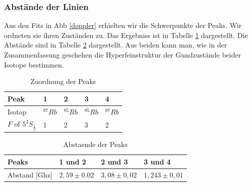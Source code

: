 \documentclass[12pt]{article}
\begin{document}
\subsubsection{Abstände der Linien}
Aus den Fits in Abb \ref{doppler} erhielten wir die Schwerpunkte der Peaks. Wir ordneten sie ihren Zuständen zu. Das Ergebniss ist in Tabelle \ref{order} dargestellt. Die Abstände sind in Tabelle \ref{dist} dargestellt. Aus beiden kann man, wie in der Zusammenfassung geschehen die Hyperfeinstruktur der Gundzustände beider Isotope bestimmen.

\begin{table}[H]
\begin{center}
\begin{tabular}{|l|l|l|l|l|}
\hline 
Peak & 1 & 2 & 3 & 4\\
\hline
Isotop & $^{87}Rb$ & $^{85}Rb$ & $^{85}Rb$ & $^{87}Rb$\\
$F$ of $5^2S_{\frac{1}{2}}$ & 1 & 2 & 3 & 2 \\
\hline
\end{tabular}
\end{center}
\caption{Zuordnung der Peaks}
\label{order}
\end{table}

\begin{table}[H]
\begin{center}
\begin{tabular}{|l|l|l|l|}
\hline
Peaks & 1 und 2 & 2 und 3 & 3 und 4\\
\hline
Abstand [Ghz] & $2,59 \pm 0.02$ & $3,08 \pm 0,02$ & $1,243 \pm 0,01$\\
\hline
\end{tabular}
\end{center}
\caption{Abstaende der Peaks}
\label{dist}
\end{table}
\end{document}
